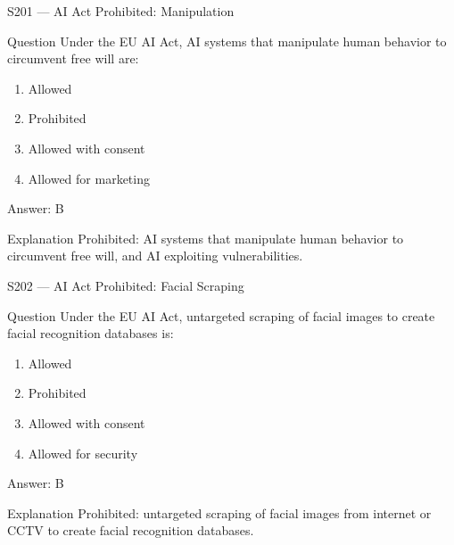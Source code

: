 \documentclass[aspectratio=169,8pt]{beamer}
\begin{document}
	\begin{frame}{S201 --- AI Act Prohibited: Manipulation}
		\begin{block}{Question}
			Under the EU AI Act, AI systems that manipulate human behavior to circumvent free will are:
			\begin{enumerate}
				\item Allowed
				\item Prohibited
				\item Allowed with consent
				\item Allowed for marketing
			\end{enumerate}
		\end{block}
		\begin{exampleblock}{Answer: B}\end{exampleblock}
		\begin{block}{Explanation}
			Prohibited: AI systems that manipulate human behavior to circumvent free will, and AI exploiting vulnerabilities.
		\end{block}
	\end{frame}
	
	\begin{frame}{S202 --- AI Act Prohibited: Facial Scraping}
		\begin{block}{Question}
			Under the EU AI Act, untargeted scraping of facial images to create facial recognition databases is:
			\begin{enumerate}
				\item Allowed
				\item Prohibited
				\item Allowed with consent
				\item Allowed for security
			\end{enumerate}
		\end{block}
		\begin{exampleblock}{Answer: B}\end{exampleblock}
		\begin{block}{Explanation}
			Prohibited: untargeted scraping of facial images from internet or CCTV to create facial recognition databases.
		\end{block}
	\end{frame}
	
\end{document}
